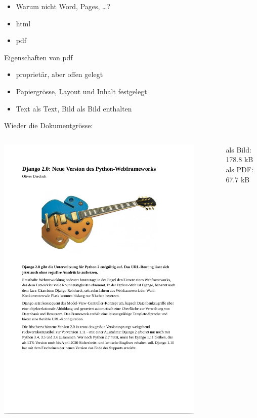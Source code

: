 \begin{frame}{}
  \begin{itemize}
    \item Warum nicht Word, Pages, \ldots ?
    \item html
    \item pdf
  \end{itemize}
\end{frame}
%
\begin{frame}[<+->]{Eigenschaften von pdf}
  \begin{itemize}
    \item proprietär, aber offen gelegt
    \item Papiergrösse, Layout und Inhalt festgelegt
    \item Text als Text, Bild als Bild enthalten
  \end{itemize}
\end{frame}
%
\begin{frame}{Wieder die Dokumentgrösse:}
  \begin{columns}
    \begin{column}{0.5\textwidth}
      \includegraphics[width=0.9\textwidth]{pics/screenshot-beispielpdf.png}
    \end{column}
    \begin{column}{0.5\textwidth}
      als Bild: 178.8 kB\\
      als PDF: 67.7 kB
    \end{column}
  \end{columns}
\end{frame}

